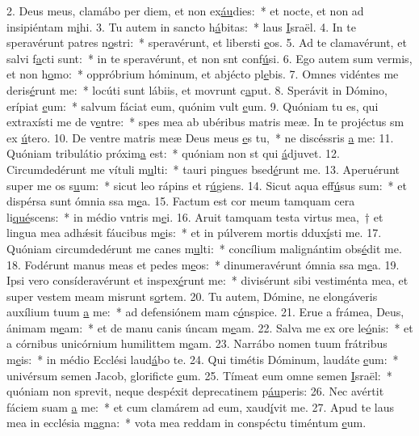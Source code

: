 2. Deus meus, clamábo per diem, et non ex\uline{áu}dies:~* et nocte, et non ad insipiéntam m\uline{i}hi.
3. Tu autem in sancto h\uline{á}bitas:~* laus \uline{I}sraël.
4. In te speravérunt patres n\uline{o}stri:~* speravérunt, et libersti \uline{e}os.
5. Ad te clamavérunt, et salvi f\uline{a}cti sunt:~* in te speravérunt, et non snt conf\uline{ú}si.
6. Ego autem sum vermis, et non h\uline{o}mo:~* oppróbrium hóminum, et abjécto pl\uline{e}bis.
7. Omnes vidéntes me deris\uline{é}runt me:~* locúti sunt lábiis, et movrunt c\uline{a}put.
8. Sperávit in Dómino, erípiat \uline{e}um:~* salvum fáciat eum, quónim vult \uline{e}um.
9. Quóniam tu es, qui extraxísti me de v\uline{e}ntre:~* spes mea ab ubéribus matris meæ. In te projéctus sm ex \uline{ú}tero.
10. De ventre matris meæ Deus meus \uline{e}s tu,~* ne discéssris \uline{a} me:
11. Quóniam tribulátio próxim\uline{a} est:~* quóniam non st qui \uline{á}djuvet.
12. Circumdedérunt me vítuli m\uline{u}lti:~* tauri pingues bsed\uline{é}runt me.
13. Aperuérunt super me os s\uline{u}um:~* sicut leo rápins et r\uline{ú}giens.
14. Sicut aqua eff\uline{ú}sus sum:~* et dispérsa sunt ómnia ssa m\uline{e}a.
15. Factum est cor meum tamquam cera li\uline{qué}scens:~* in médio vntris m\uline{e}i.
16. Aruit tamquam testa virtus mea,~† et lingua mea adhǽsit fáucibus m\uline{e}is:~* et in púlverem mortis ddux\uline{í}sti me.
17. Quóniam circumdedérunt me canes m\uline{u}lti:~* concílium malignántim obs\uline{é}dit me.
18. Fodérunt manus meas et pedes m\uline{e}os:~* dinumeravérunt ómnia ssa m\uline{e}a.
19. Ipsi vero consíderavérunt et inspex\uline{é}runt me:~* divisérunt sibi vestiménta mea, et super vestem meam misrunt s\uline{o}rtem.
20. Tu autem, Dómine, ne elongáveris auxílium tuum \uline{a} me:~* ad defensiónem mam c\uline{ó}nspice.
21. Erue a frámea, Deus, ánimam m\uline{e}am:~* et de manu canis úncam m\uline{e}am.
22. Salva me ex ore le\uline{ó}nis:~* et a córnibus unicórnium humilittem m\uline{e}am.
23. Narrábo nomen tuum frátribus m\uline{e}is:~* in médio Ecclési laud\uline{á}bo te.
24. Qui timétis Dóminum, laudáte \uline{e}um:~* univérsum semen Jacob, glorificte \uline{e}um.
25. Tímeat eum omne semen \uline{I}sraël:~* quóniam non sprevit, neque despéxit deprecatinem p\uline{áu}peris:
26. Nec avértit fáciem suam \uline{a} me:~* et cum clamárem ad eum, xaud\uline{í}vit me.
27. Apud te laus mea in ecclésia m\uline{a}gna:~* vota mea reddam in conspéctu timéntum \uline{e}um.
